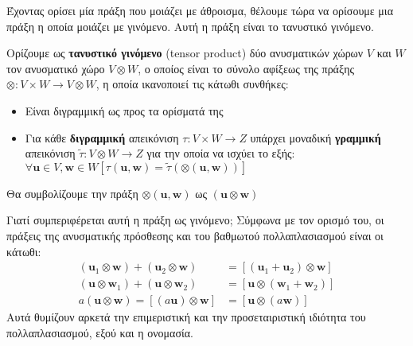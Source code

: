 \documentclass[main.tex]{subfiles}
\begin{document}
	Έχοντας ορίσει μία πράξη που μοιάζει με άθροισμα, θέλουμε τώρα να ορίσουμε μια πράξη η οποία μοιάζει με γινόμενο. Αυτή η πράξη είναι το τανυστικό γινόμενο.
	\begin{definition}
		Ορίζουμε ως \textbf{τανυστικό γινόμενο} (tensor product) δύο ανυσματικών χώρων $V$ και $W$ τον ανυσματικό χώρο $V\otimes W$, ο οποίος είναι το σύνολο αφίξεως της πράξης ${\otimes:V\times W \rightarrow V\otimes W}$, η οποία ικανοποιεί τις κάτωθι συνθήκες:
		\begin{itemize}
			\item Είναι διγραμμική ως προς τα ορίσματά της
			\item Για κάθε \textbf{διγραμμική} απεικόνιση ${\tau : V\times W \rightarrow Z}$ υπάρχει μοναδική \textbf{γραμμική} απεικόνιση ${\tilde{\tau}:V\otimes W \rightarrow Z}$ για την οποία να ισχύει το εξής: $\forall \boldsymbol{u} \in V, \boldsymbol{w} \in W[\tau(\boldsymbol{u},\boldsymbol{w}) = \tilde{\tau}(\otimes(\boldsymbol{u},\boldsymbol{w}))]$
 		\end{itemize}
 		Θα συμβολίζουμε την πράξη $\otimes(\boldsymbol{u},\boldsymbol{w})$ ως $(\boldsymbol{u}\otimes\boldsymbol{w})$
 	\end{definition}
 	Γιατί συμπεριφέρεται αυτή η πράξη ως γινόμενο; Σύμφωνα με τον ορισμό του, οι πράξεις της ανυσματικής πρόσθεσης και του βαθμωτού πολλαπλασιασμού είναι οι κάτωθι:
 	\begin{align*}
 		(\boldsymbol{u}_1\otimes\boldsymbol{w}) + (\boldsymbol{u}_2\otimes\boldsymbol{w}) &= [(\boldsymbol{u}_1 + \boldsymbol{u}_2)\otimes\boldsymbol{w}] \\
 		(\boldsymbol{u}\otimes\boldsymbol{w}_1) + (\boldsymbol{u}\otimes\boldsymbol{w}_2) &= [\boldsymbol{u}\otimes(\boldsymbol{w}_1 + \boldsymbol{w}_2)] \\
 		a(\boldsymbol{u}\otimes\boldsymbol{w}) = [(a\boldsymbol{u})\otimes\boldsymbol{w}] &= [\boldsymbol{u}\otimes(a\boldsymbol{w})]
 	\end{align*}
 	Αυτά θυμίζουν αρκετά την επιμεριστική και την προσεταιριστική ιδιότητα του πολλαπλασιασμού, εξού και η ονομασία.
\end{document}
